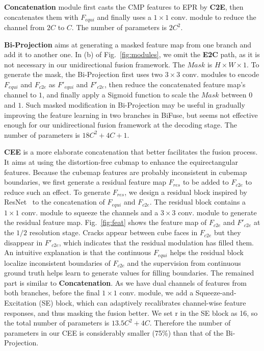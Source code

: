 \documentclass[letterpaper, 10 pt, conference]{ieeeconf}
\begin{document}
\textbf{Concatenation} module first casts the CMP features to EPR by \textbf{C2E}, then concatenates them with $F_{equi}$ and finally uses a $1 \times 1$ conv. module to reduce the channel from $2C$ to $C$. The number of parameters is $2C^2$. 

\textbf{Bi-Projection} \cite{wang2020bifuse} aims at generating a masked feature map from one branch and add it to another one. In (b) of Fig.~\ref{fig:modules}, we omit the \textbf{E2C} path, as it is not necessary in our unidirectional fusion framework. The $Mask$ is $H \times W \times 1$. To generate the mask, the Bi-Projection first uses two $3 \times 3$ conv. modules to encode $F_{equi}$ and $F_{c2e}$ as  $F'_{equi}$ and $F'_{c2e}$, then reduce the concatenated feature map's channel to $1$, and finally apply a Sigmoid function to scale the $Mask$ between $0$ and $1$. Such masked modification in Bi-Projection may be useful in gradually improving the feature learning in two branches in BiFuse, but seems not effective enough for our unidirectional fusion framework at the decoding stage. The number of parameters is $18C^2 + 4C + 1$. 

\textbf{CEE} is a more elaborate concatenation that better facilitates the fusion process. It aims at using the distortion-free cubmap to enhance the equirectangular features. Because the cubemap features are probably inconsistent in cubemap boundaries, we first generate a residual feature map $F_{res}$ to be added to $F_{c2e}$ to reduce such an effect. To generate $F_{res}$, we design a residual block inspired by ResNet~\cite{he2016deep} to the concatenation of $F_{equi}$ and $F_{c2e}$. The residual block contains a $1 \times 1$ conv. module to squeeze the channels and a $3 \times 3$ conv. module to generate the residual feature map. 
{Fig.~\ref{fig:feat} shows the feature map of $F_{c2e}$ and $F'_{c2e}$ at the $1/2$ resolution stage. Cracks appear between cube faces in $F_{c2e}$ but they disappear in $F'_{c2e}$, which indicates that the residual modulation has filled them. An intuitive explanation is that the continuous $F_{equi}$ helps the residual block localize inconsistent boundaries of $F_{c2e}$ and the supervision from continuous ground truth helps learn to generate values for filling boundaries.}
The remained part is similar to \textbf{Concatenation}. As we have dual channels of features from both branches, before the final $1 \times 1$ conv. module, we add a Squeeze-and-Excitation (SE) \cite{hu2018squeeze} block, which can adaptively recalibrates channel-wise feature responses, and thus masking the fusion better. We set r in the SE block as 16, so the total number of parameters is $13.5C^2+ 4C$. Therefore the number of parameters in our CEE is considerably smaller (75\%) than that of the Bi-Projection.
\end{document}
